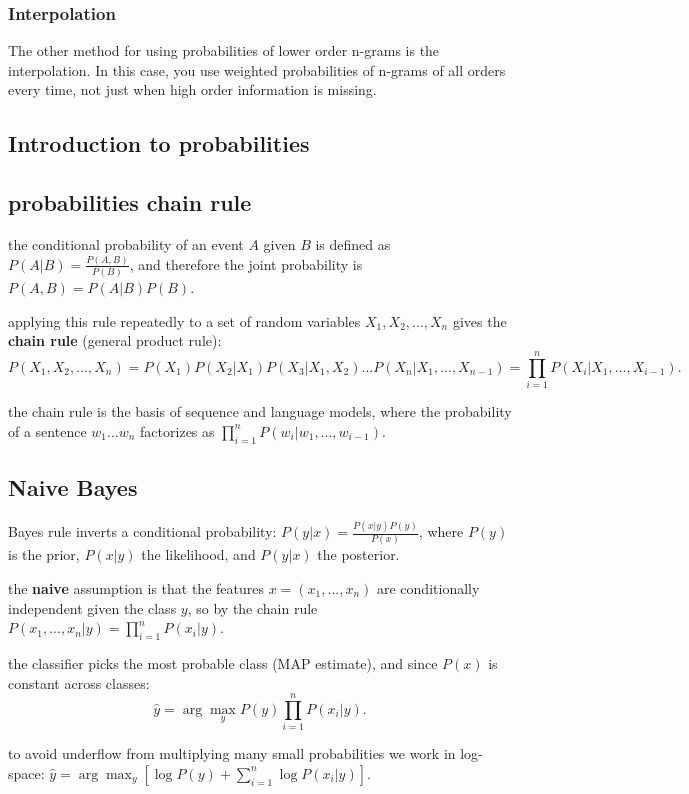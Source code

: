 \documentclass[4apaper,12pt]{book}
\begin{document}
\begin{description}
    \subsection{Interpolation}
    \begin{description}
    \item The other method for using probabilities of lower order n-grams is the interpolation. In this case, you use weighted probabilities of n-grams of all orders every time, not just when high order information is missing.
    \end{description}


\end{description}




\begin{appendices}
  \chapter{Introduction to probabilities}
  \section{probabilities chain rule}
  \begin{description}
  \item the conditional probability of an event $A$ given $B$ is defined as $P(A|B)=\frac{P(A,B)}{P(B)}$, and therefore the joint probability is $P(A,B)=P(A|B)P(B)$.
  \item applying this rule repeatedly to a set of random variables $X_1, X_2, ..., X_n$ gives the \textbf{chain rule} (general product rule): $$P(X_1, X_2, ..., X_n)=P(X_1)P(X_2|X_1)P(X_3|X_1,X_2)...P(X_n|X_1,...,X_{n-1}) = \prod_{i=1}^{n}P(X_i|X_1,...,X_{i-1}).$$
  \item the chain rule is the basis of sequence and language models, where the probability of a sentence $w_1...w_n$ factorizes as $\prod_{i=1}^n P(w_i|w_1,...,w_{i-1})$.
  \end{description}
  \section {Naive Bayes}
  \begin{description}
  \item Bayes rule inverts a conditional probability: $P(y|x)=\frac{P(x|y)P(y)}{P(x)}$, where $P(y)$ is the prior, $P(x|y)$ the likelihood, and $P(y|x)$ the posterior.
  \item the \textbf{naive} assumption is that the features $x=(x_1,...,x_n)$ are conditionally independent given the class $y$, so by the chain rule $P(x_1,...,x_n|y)=\prod_{i=1}^{n}P(x_i|y)$.
  \item the classifier picks the most probable class (MAP estimate), and since $P(x)$ is constant across classes: $$\hat{y}=\arg\max_{y}P(y)\prod_{i=1}^{n}P(x_i|y).$$
  \item to avoid underflow from multiplying many small probabilities we work in log-space: $\hat{y}=\arg\max_{y}\left[\log P(y)+\sum_{i=1}^{n}\log P(x_i|y)\right]$.
  \end{description}

\end{appendices}
\end{document}
